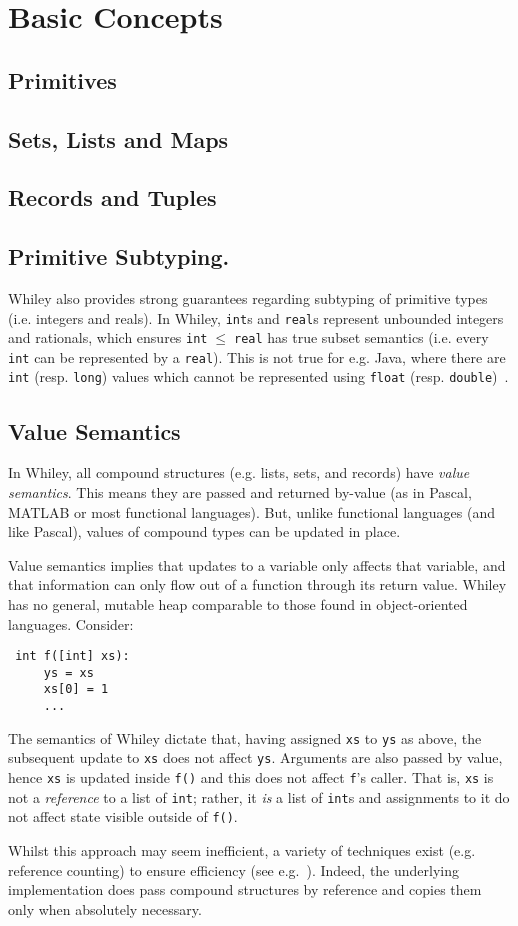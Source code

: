 \newpage
\section{Basic Concepts}

\subsection{Primitives}

\subsection{Sets, Lists and Maps}

\subsection{Records and Tuples}

\subsection{Primitive Subtyping.} 
Whiley also provides strong guarantees regarding subtyping of
primitive types (i.e. integers and reals).  In Whiley,
\lstinline{int}s and \lstinline{real}s represent unbounded integers
and rationals, which ensures \lstinline{int}$\;\le\;$\lstinline{real}
has true subset semantics (i.e. every \lstinline{int} can be
represented by a \lstinline{real}).  This is not true for e.g. Java,
where there are \lstinline{int} (resp. \lstinline{long}) values which
cannot be represented using \lstinline{float}
(resp. \lstinline{double})~\cite[\S5.1.2]{GJSB05}.

\subsection{Value Semantics}
\label{value_semantics}
In Whiley, all compound structures (e.g. lists, sets, and records)
have {\em value semantics}.  This means they are passed and returned
by-value (as in Pascal, MATLAB or most functional languages).  But, unlike
functional languages (and like Pascal), values of compound types can
be updated in place.

Value semantics implies that updates to a variable only affects that
variable, and that information can only flow out of a function through
its return value.  Whiley has no general, mutable heap comparable to
those found in object-oriented languages.  Consider:
\begin{lstlisting}
 int f([int] xs):
     ys = xs
     xs[0] = 1
     ...
\end{lstlisting}
The semantics of Whiley dictate that, having assigned \lstinline{xs}
to \lstinline{ys} as above, the subsequent update to \lstinline{xs}
does not affect \lstinline{ys}.  Arguments are also passed by value,
hence \lstinline{xs} is updated inside \lstinline{f()} and this does
not affect \lstinline{f}'s caller.  That is, \lstinline{xs} is not a
{\em reference} to a list of \lstinline{int}; rather, it {\em is} a
list of \lstinline{int}s and assignments to it do not affect state
visible outside of \lstinline{f()}. 

Whilst this approach may seem inefficient, a variety of techniques
exist (e.g. reference counting) to ensure efficiency (see
e.g.~\cite{LH11,Shank01,Ode91}).  Indeed, the underlying
implementation does pass compound structures by reference and copies
them only when absolutely necessary.

